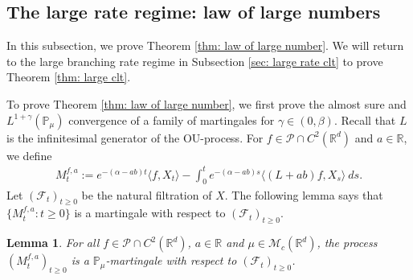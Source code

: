 \documentclass[12pt,a4paper]{amsart}
\theoremstyle{plain}
\newtheorem{lem}[thm]{Lemma}
\theoremstyle{definition}
\numberwithin{equation}{section}
\begin{document}
\subsection{The large rate regime: law of large numbers}
\label{sec: large rate lln}

    In this subsection, we prove Theorem \ref{thm: law of large number}.
    We will return to the large branching rate regime in Subsection \ref{sec: large rate clt} to prove Theorem \ref{thm: large clt}.

    To prove Theorem \ref{thm: law of large number}, we first prove the almost sure and $L^{1+\gamma}(\mathbb{P}_{\mu})$ convergence of a family of martingales for $\gamma\in (0, \beta)$. Recall that $L$ is the infinitesimal generator of the OU-process.  For $f\in \mathcal{P}\cap C^2(\mathbb R^d)$ and  $a\in \mathbb R$, we define
\begin{align}
\label{defmartingale}
    M_t^{f,a}
    :=e^{-(\alpha-ab)t}\langle f,X_t\rangle-\int_0^t e^{-(\alpha-ab)s}\langle (L+ab)f, X_s\rangle~ ds.
\end{align}
    Let $(\mathscr{F}_t)_{t\geq 0}$ be the natural filtration of $X$.  The following lemma says that $\{M_t^{f,a}: t\geq 0\}$ is a martingale with respect to $(\mathscr{F}_t)_{t\geq 0}$.
\begin{lem}
\label{lemma25}
    For all $f\in \mathcal{P}\cap C^2(\mathbb R^d)$, $a\in \mathbb R$ and $\mu\in \mathcal M_c(\mathbb R^d)$, the process $(M_t^{f,a})_{t\geq 0}$ is a $\mathbb P_\mu$-martingale with respect to $(\mathscr F_t)_{t\geq 0}$.
\end{lem}
\end{document}
